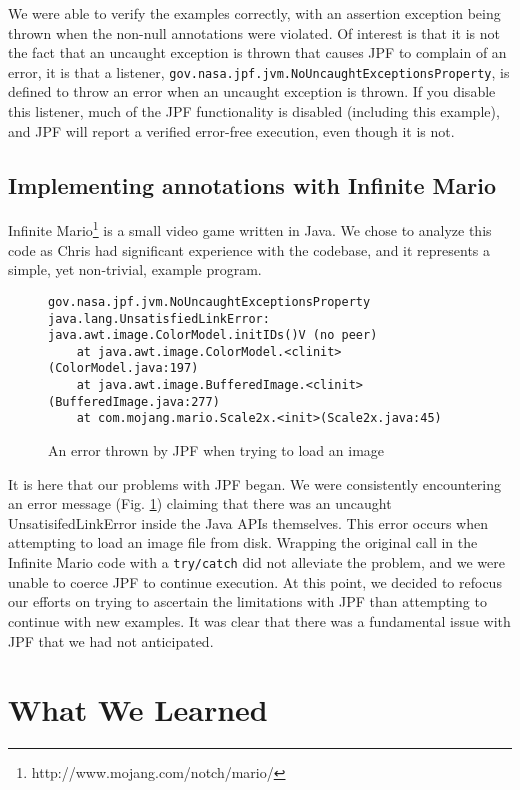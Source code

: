\documentclass[twocolumn]{article}
\begin{document}
We were able to verify the examples correctly, with an assertion exception being thrown when the non-null annotations were violated. Of interest is that it is not the fact that an uncaught exception is thrown that causes JPF to complain of an error, it is that a listener, \texttt{gov.nasa.jpf.jvm.NoUncaughtExceptionsProperty}, is defined to throw an error when an uncaught exception is thrown. If you disable this listener, much of the JPF functionality is disabled (including this example), and JPF will report a verified error-free execution, even though it is not.

\subsection{Implementing annotations with Infinite Mario}
Infinite Mario\footnote{http://www.mojang.com/notch/mario/} is a small video game written in Java. We chose to analyze this code as Chris had significant experience with the codebase, and it represents a simple, yet non-trivial, example program.

\begin{figure}[tb]
    \lstset{language=,breaklines=true}
    \begin{lstlisting}
gov.nasa.jpf.jvm.NoUncaughtExceptionsProperty
java.lang.UnsatisfiedLinkError: java.awt.image.ColorModel.initIDs()V (no peer)
    at java.awt.image.ColorModel.<clinit>(ColorModel.java:197)
	at java.awt.image.BufferedImage.<clinit>(BufferedImage.java:277)
    at com.mojang.mario.Scale2x.<init>(Scale2x.java:45)
\end{lstlisting}
	\caption{An error thrown by JPF when trying to load an image}
	    \label{listing:error}
	\end{figure}

It is here that our problems with JPF began. We were consistently encountering an error message (Fig. \ref{listing:error}) claiming that there was an uncaught UnsatisifedLinkError inside the Java APIs themselves. This error occurs when attempting to load an image file from disk. Wrapping the original call in the Infinite Mario code with a \texttt{try/catch} did not alleviate the problem, and we were unable to coerce JPF to continue execution. At this point, we decided to refocus our efforts on trying to ascertain the limitations with JPF than attempting to continue with new examples. It was clear that there was a fundamental issue with JPF that we had not anticipated. 

\section{What We Learned}
\end{document}
